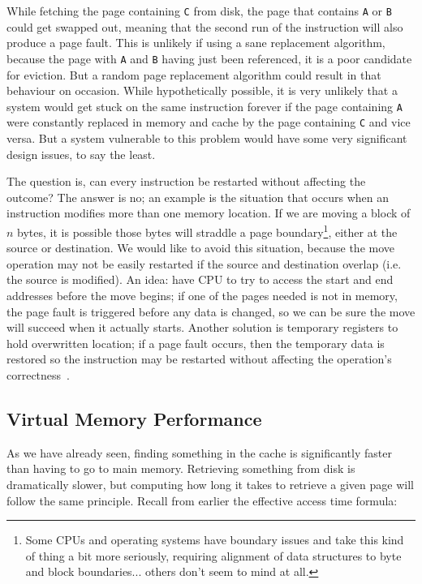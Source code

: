 While fetching the page containing \texttt{C} from disk, the page that contains \texttt{A} or \texttt{B} could get swapped out, meaning that the second run of the instruction will also produce a page fault. This is unlikely if using a sane replacement algorithm, because the page with \texttt{A} and \texttt{B} having just been referenced, it is a poor candidate for eviction. But a random page replacement algorithm could result in that behaviour on occasion. While hypothetically possible, it is very unlikely that a system would get stuck on the same instruction forever if the page containing \texttt{A} were constantly replaced in memory and cache by the page containing \texttt{C} and vice versa. But a system vulnerable to this problem would have some very significant design issues, to say the least.

The question is, can every instruction be restarted without affecting the outcome? The answer is no; an example is the situation that occurs when an instruction modifies more than one memory location. If we are moving a block of $n$ bytes, it is possible those bytes will straddle a page boundary\footnote{Some CPUs and operating systems have boundary issues and take this kind of thing a bit more seriously, requiring alignment of data structures to byte and block boundaries... others don't seem to mind at all.}, either at the source or destination. We would like to avoid this situation, because the move operation may not be easily restarted if the source and destination overlap (i.e. the source is modified). An idea: have CPU to try to access the start and end addresses before the move begins; if one of the pages needed is not in memory, the page fault is triggered before any data is changed, so we can be sure the move will succeed when it actually starts. Another solution is temporary registers to hold overwritten location; if a page fault occurs, then the temporary data is restored so the instruction may be restarted without affecting the operation's correctness~\cite{osc}.

\subsection*{Virtual Memory Performance}

As we have already seen, finding something in the cache is significantly faster than having to go to main memory. Retrieving something from disk is dramatically slower, but computing how long it takes to retrieve a given page will follow the same principle. Recall from earlier the effective access time formula:

